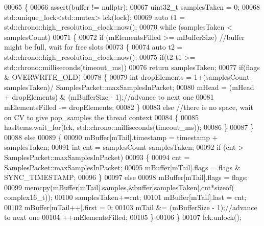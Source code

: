 \begin{DoxyCode}
00065     \{
00066         assert(buffer != \textcolor{keyword}{nullptr});
00067         uint32\_t samplesTaken = 0;
00068         std::unique\_lock<std::mutex> lck(lock);
00069         \textcolor{keyword}{auto} t1 = std::chrono::high\_resolution\_clock::now();
00070         \textcolor{keywordflow}{while} (samplesTaken < samplesCount)
00071         \{
00072             \textcolor{keywordflow}{if} (mElementsFilled >= mBufferSize) \textcolor{comment}{//buffer might be full, wait for free slots}
00073             \{
00074                 \textcolor{keyword}{auto} t2 = std::chrono::high\_resolution\_clock::now();
00075                 \textcolor{keywordflow}{if}(t2-t1 >= std::chrono::milliseconds(timeout\_ms))
00076                     \textcolor{keywordflow}{return} samplesTaken;
00077                 \textcolor{keywordflow}{if}(flags & OVERWRITE_OLD)
00078                 \{
00079                     \textcolor{keywordtype}{int} dropElements = 1+(samplesCount-samplesTaken)/
      SamplesPacket::maxSamplesInPacket;
00080                     mHead = (mHead + dropElements) & (mBufferSize - 1);\textcolor{comment}{//advance to next one}
00081                     mElementsFilled -= dropElements;
00082                 \}
00083                 \textcolor{keywordflow}{else}  \textcolor{comment}{//there is no space, wait on CV to give pop\_samples the thread context}
00084                 \{
00085                     hasItems.wait\_for(lck, std::chrono::milliseconds(timeout\_ms));
00086                 \}
00087             \}
00088             \textcolor{keywordflow}{else}
00089             \{
00090                 mBuffer[mTail].timestamp = timestamp + samplesTaken;
00091                 \textcolor{keywordtype}{int} cnt = samplesCount-samplesTaken;
00092                 \textcolor{keywordflow}{if} (cnt > SamplesPacket::maxSamplesInPacket)
00093                 \{
00094                     cnt = SamplesPacket::maxSamplesInPacket;
00095                     mBuffer[mTail].flags = flags & SYNC_TIMESTAMP;
00096                 \}
00097                 \textcolor{keywordflow}{else}
00098                     mBuffer[mTail].flags = flags;
00099                 memcpy(mBuffer[mTail].samples,&buffer[samplesTaken],cnt*\textcolor{keyword}{sizeof}(
      complex16_t));
00100                 samplesTaken+=cnt;
00101                 mBuffer[mTail].last = cnt;
00102                 mBuffer[mTail++].first = 0;
00103                 mTail  &= (mBufferSize - 1);\textcolor{comment}{//advance to next one}
00104                 ++mElementsFilled;
00105             \}
00106         \}
00107         lck.unlock();

\end{DoxyCode}
